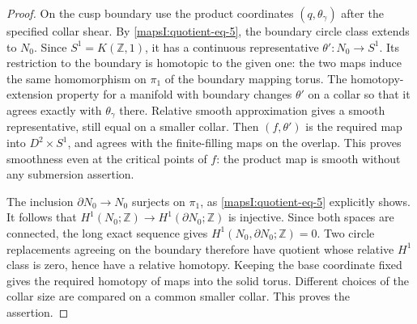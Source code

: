 \begin{proof}
On the cusp boundary use the product coordinates
$(q,\theta_\gamma)$ after the specified collar shear.
By \eqref{mapsI:quotient-eq-5}, the boundary circle class extends to $N_0$.
Since $S^1=K(\mathbb Z,1)$, it has a continuous representative
$\theta':N_0\to S^1$.  Its restriction to the boundary is
homotopic to the given one: the two maps induce the same
homomorphism on $\pi_1$ of the boundary mapping torus.
The homotopy-extension property for a manifold with boundary
changes $\theta'$ on a collar so that it agrees exactly with
$\theta_\gamma$ there.  Relative smooth approximation gives
a smooth representative, still equal on a smaller collar.
Then $(f,\theta')$ is the required map into $D^2\times S^1$,
and agrees with the finite-filling maps on the overlap.
This proves smoothness even at the critical points of $f$:
the product map is smooth without any submersion assertion.

The inclusion $\partial N_0\to N_0$ surjects on $\pi_1$,
as \eqref{mapsI:quotient-eq-5} explicitly shows.  It follows that
$H^1(N_0;\mathbb Z)\to H^1(\partial N_0;\mathbb Z)$
is injective.  Since both spaces are connected, the long
exact sequence gives $H^1(N_0,\partial N_0;\mathbb Z)=0$.
Two circle replacements agreeing on the boundary therefore
have quotient whose relative $H^1$ class is zero, hence
have a relative homotopy.  Keeping the base coordinate
fixed gives the required homotopy of maps into the solid
torus.  Different choices of the collar size are compared
on a common smaller collar.  This proves the assertion.
\end{proof}

